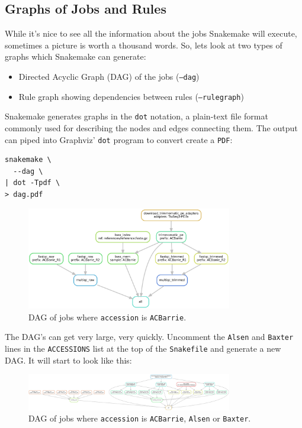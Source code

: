 \subsection{Graphs of Jobs and Rules}

While it's nice to see all the information about the jobs Snakemake will execute, sometimes a picture is worth a thousand words. So, lets look at two
types of graphs which Snakemake can generate:

\begin{itemize}
  \item Directed Acyclic Graph (DAG) of the jobs (\texttt{--dag})
  \item Rule graph showing dependencies between rules (\texttt{--rulegraph})
\end{itemize}

Snakemake generates graphs in the \texttt{dot} notation, a plain-text file format commonly used for describing the nodes and edges connecting them. The
output can piped into Graphviz' \texttt{dot} program to convert create a \texttt{PDF}:

\begin{lstlisting}
snakemake \
  --dag \
| dot -Tpdf \
> dag.pdf
\end{lstlisting}

\begin{figure}[H]
\centering
\includegraphics[width=0.8\textwidth]{handout/dag.pdf}
\caption{DAG of jobs where \texttt{accession} is \texttt{ACBarrie}.}
\label{fig:dag}
\end{figure}

The DAG's can get very large, very quickly. Uncomment the \texttt{Alsen} and \texttt{Baxter} lines in the \texttt{ACCESSIONS} list at the top of the
\texttt{Snakefile} and generate a new DAG. It will start to look like this:

\begin{figure}[H]
\centering
\includegraphics[width=0.8\textwidth]{handout/dag_bigger.pdf}
\caption{DAG of jobs where \texttt{accession} is \texttt{ACBarrie}, \texttt{Alsen} or \texttt{Baxter}.}
\label{fig:dag_bigger}
\end{figure}

